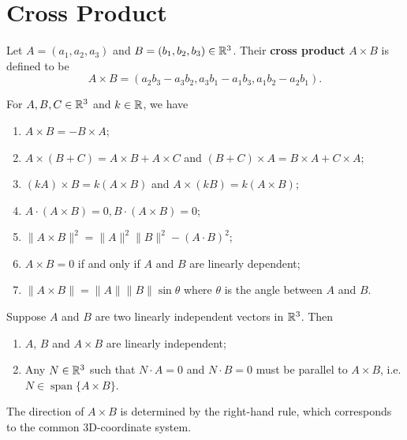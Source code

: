     \section{Cross Product}
    \begin{definitionenv}
        Let $A=(a_1,a_2,a_3)$ and $B=(b_1,b_2,b_3) \in \mathbb{R}^3$. Their \textbf{cross product} $A \times B$ is defined to be
        $$ A \times B = (a_2 b_3 - a_3 b_2, a_3 b_1 - a_1 b_3, a_1 b_2 - a_2 b_1). $$
    \end{definitionenv}
    \begin{theoremenv}
        For $A,B,C\in \mathbb{R}^3$ and $k \in \mathbb{R}$, we have
        \begin{enumerate}[label=(\arabic*)]
            \item $A \times B = - B \times A$;
            \item $A \times (B+C) = A \times B + A \times C$ and $(B+C)\times A = B\times A + C\times A$;
            \item $(kA) \times B = k (A\times B)$ and $A\times (kB) = k (A\times B)$;
            \item $A\cdot (A\times B) = 0, B \cdot (A\times B) = 0$;
            \item $\| A \times B\| ^2 = \|A\|^2 \|B\|^2 - (A\cdot B)^2$;
            \item $A\times B = 0$ if and only if $A$ and $B$ are linearly dependent;
            \item $\|A\times B\| = \|A\|\|B\|\sin\theta$ where $\theta$ is the angle between $A$ and $B$.
            
        \end{enumerate}
    \end{theoremenv}
    \begin{theoremenv}
        Suppose $A$ and $B$ are two linearly independent vectors in $\mathbb{R}^3$. Then
        \begin{enumerate}
            \item $A$, $B$ and $A\times B$ are linearly independent;
            \item Any $N\in \mathbb{R}^3$ such that $N\cdot A = 0$ and $N\cdot B = 0$ must be parallel to $A\times B$, i.e. $ N \in \operatorname{span} \{A\times B\}$.
        \end{enumerate}
    \end{theoremenv}
    \begin{remarkenv}
        The direction of $A\times B$ is determined by the right-hand rule, which corresponds to the common 3D-coordinate system. 
    \end{remarkenv}
